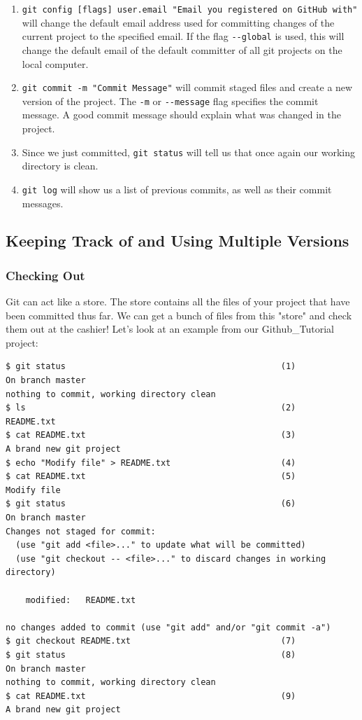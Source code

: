 \documentclass[11pt,fleqn]{article}
\theoremstyle{definition}
\begin{document}
\begin{enumerate}
\item \verb|git config [flags] user.email "Email you registered on GitHub with"| will change the default email address used for committing changes of the current project to the specified email. If the flag \verb|--global| is used, this will change the default email of the default committer of all git projects on the local computer.
\item \verb|git commit -m "Commit Message"| will commit staged files and create a new version of the project. The \verb|-m| or \verb|--message| flag specifies the commit message. A good commit message should explain what was changed in the project.
\item Since we just committed, \verb|git status| will tell us that once again our working directory is clean.
\item \verb|git log| will show us a list of previous commits, as well as their commit messages.
\end{enumerate}

\newpage
\subsection{Keeping Track of and Using Multiple Versions}

\subsubsection{Checking Out}
Git can act like a store. The store contains all the files of your project that have been committed thus far. We can get a bunch of files from this "store" and check them out at the cashier! Let's look at an example from our Github\_Tutorial project:

\begin{verbatim}
$ git status                                           (1)
On branch master
nothing to commit, working directory clean
$ ls                                                   (2)
README.txt
$ cat README.txt                                       (3)
A brand new git project
$ echo "Modify file" > README.txt                      (4)
$ cat README.txt                                       (5)
Modify file
$ git status                                           (6)
On branch master
Changes not staged for commit:
  (use "git add <file>..." to update what will be committed)
  (use "git checkout -- <file>..." to discard changes in working directory)

	modified:   README.txt

no changes added to commit (use "git add" and/or "git commit -a")
$ git checkout README.txt                              (7)
$ git status                                           (8)
On branch master
nothing to commit, working directory clean
$ cat README.txt                                       (9)
A brand new git project
\end{verbatim}
\end{document}
